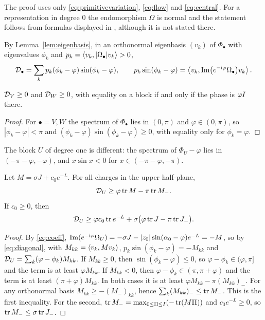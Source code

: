 The proof uses only \eqref{eq:primitivevariation}, \eqref{eq:flow} and
\eqref{eq:central}. For a representation in degree $0$ the endomorphism $\Omega$ is
normal and the statement follows from formulas displayed in
\cite[\S\S4.2, 5.1]{hkkp26}, although it is not stated there.

By Lemma~\ref{lem:eigenbasis}, in an orthonormal eigenbasis $(v_k)$ of
$\Phi_\bullet$ with eigenvalues $\phi_k$ and
$p_k=\left\langle v_k,|\Omega_\bullet|v_k\right\rangle>0$,
\begin{equation}\label{eq:diagonal}
 \mathcal D_\bullet=\sum_kp_k(\phi_k-\varphi)\sin(\phi_k-\varphi),\qquad
 p_k\sin(\phi_k-\varphi)=\left\langle v_k,\operatorname{Im}\bigl(e^{-\mathrm i\varphi}\Omega_\bullet\bigr)v_k\right\rangle.
\end{equation}

\begin{proposition}\label{prop:degreezero}
$\mathcal D_V\geq0$ and $\mathcal D_W\geq0$, with equality on a block if and only if the
phase is $\varphi I$ there.
\end{proposition}

\begin{proof}
For $\bullet=V,W$ the spectrum of $\Phi_\bullet$ lies in $(0,\pi)$ and
$\varphi\in(0,\pi)$, so $|\phi_k-\varphi|<\pi$ and
$(\phi_k-\varphi)\sin(\phi_k-\varphi)\geq0$, with equality only for
$\phi_k=\varphi$.
\end{proof}

The block $U$ of degree one is different: the spectrum of $\Phi_U-\varphi$
lies in $(-\pi-\varphi,-\varphi)$, and $x\sin x<0$ for
$x\in(-\pi-\varphi,-\pi)$.

\begin{proposition}\label{prop:degreeone}
Let $M=\sigma J+c_0e^{-L}$. For all charges in the upper half-plane,
\[
 \mathcal D_U\geq\varphi\operatorname{tr} M-\pi\operatorname{tr} M_- .
\]
If $c_0\geq0$, then
\[
 \mathcal D_U\geq\varphi c_0\operatorname{tr} e^{-L}+\sigma\bigl(\varphi\operatorname{tr} J-\pi\operatorname{tr} J_-\bigr).
\]
\end{proposition}

\begin{proof}
By \eqref{eq:coeff},
$\operatorname{Im}(e^{-\mathrm i\varphi}\Omega_U)=-\sigma J-|z_0|\sin(\alpha_0-\varphi)e^{-L}=-M$,
so by \eqref{eq:diagonal}, with $M_{kk}=\left\langle v_k,Mv_k\right\rangle$,
$p_k\sin(\phi_k-\varphi)=-M_{kk}$ and
$\mathcal D_U=\sum_k(\varphi-\phi_k)M_{kk}$. If $M_{kk}\geq0$, then
$\sin(\phi_k-\varphi)\leq0$, so $\varphi-\phi_k\in(\varphi,\pi]$ and the term
is at least $\varphi M_{kk}$. If $M_{kk}<0$, then
$\varphi-\phi_k\in(\pi,\pi+\varphi)$ and the term is at least
$(\pi+\varphi)M_{kk}$. In both cases it is at least
$\varphi M_{kk}-\pi(M_{kk})_-$. For any orthonormal basis
$M_{kk}\geq-(M_-)_{kk}$, hence $\sum_k(M_{kk})_-\leq\operatorname{tr} M_-$. This is the first
inequality. For the second, $\operatorname{tr} M_-=\max_{0\leq\Pi\leq I}(-\operatorname{tr}(M\Pi))$ and
$c_0e^{-L}\geq0$, so $\operatorname{tr} M_-\leq\sigma\operatorname{tr} J_-$.
\end{proof}

